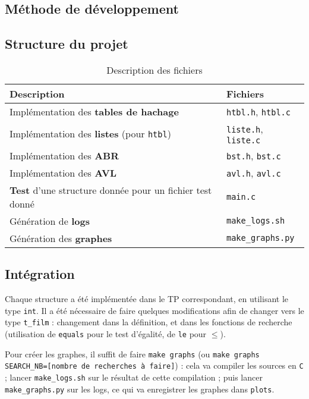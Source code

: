 \documentclass[a4paper, 12pt, twoside]{article}
\begin{document}
\begin{indt}{\section{Méthode de développement}}
\begin{indt}{\subsection{Structure du projet}}
\begin{table}[H]
                \begin{tabular}{|l|l|}
                    \hline
                    Description
                    & Fichiers
                    \\
                    \hline
                    \hline
                    Implémentation des \textbf{tables de hachage}
                    & \texttt{htbl.h}, \texttt{htbl.c}
                    \\
                    \hline
                    Implémentation des \textbf{listes} (pour \texttt{htbl})
                    & \texttt{liste.h}, \texttt{liste.c}
                    \\
                    \hline
                    Implémentation des \textbf{ABR}
                    & \texttt{bst.h}, \texttt{bst.c}
                    \\
                    \hline
                    Implémentation des \textbf{AVL}
                    & \texttt{avl.h}, \texttt{avl.c}
                    \\
                    \hline
                    \textbf{Test} d'une structure donnée pour un fichier test donné
                    & \texttt{main.c}
                    \\
                    \hline
                    Génération de \textbf{logs}
                    & \texttt{make\_logs.sh}
                    \\
                    \hline
                    Génération des \textbf{graphes}
                    & \texttt{make\_graphs.py}
                    \\
                    \hline
                \end{tabular}
            
                \caption{Description des fichiers}
                \label{tab:file_desc}
            \end{table}%
        \end{indt} %

        \begin{indt}{\subsection{Intégration}} %
            Chaque structure a été implémentée dans le TP correspondant, en utilisant le type \texttt{int}.
            Il a été nécessaire de faire quelques modifications afin de changer vers le type \texttt{t\_film} : changement dans la définition, et dans les fonctions de recherche (utilisation de \texttt{equals} pour le test d'égalité, de \texttt{le} pour $\le$).

            Pour créer les graphes, il suffit de faire \texttt{make graphs} (ou \texttt{make graphs SEARCH\_NB=[nombre de recherches à faire]}) : cela va compiler les sources en \texttt C ; lancer \texttt{make\_logs.sh} sur le résultat de cette compilation ; puis lancer \texttt{make\_graphs.py} sur les logs, ce qui va enregistrer les graphes dans \texttt{plots}.
        \end{indt} %
    \end{indt}%
\end{document}
